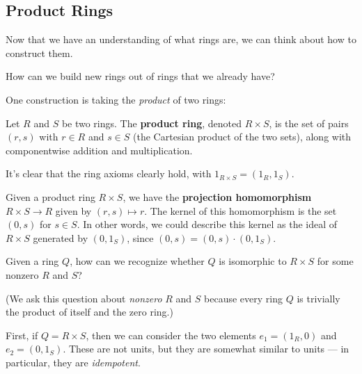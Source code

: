 \subsection{Product Rings}

Now that we have an understanding of what rings are, we can think about how to construct them. 

\begin{qq}
How can we build new rings out of rings that we already have?
\end{qq}

One construction is taking the \emph{product} of two rings:

\begin{definition}
Let $R$ and $S$ be two rings. The \textbf{product ring}, denoted $R \times S$, is the set of pairs $(r, s)$ with $r \in R$ and $s \in S$ (the Cartesian product of the two sets), along with componentwise addition and multiplication.
\end{definition}

It's clear that the ring axioms clearly hold, with $1_{R \times S} = (1_R, 1_S)$. 

Given a product ring $R \times S$, we have the \textbf{projection homomorphism} $R \times S \to R$ given by $(r, s) \mapsto r$. The kernel of this homomorphism is the set $(0, s)$ for $s \in S$. In other words, we could describe this kernel as the ideal of $R \times S$ generated by $(0, 1_S)$, since $(0, s) = (0, s)\cdot (0, 1_S)$. 




\begin{qq}
Given a ring $Q$, how can we recognize whether $Q$ is isomorphic to $R \times S$ for some nonzero $R$ and $S$?
\end{qq}

(We ask this question about \emph{nonzero} $R$ and $S$ because every ring $Q$ is trivially the product of itself and the zero ring.)

First, if $Q = R \times S$, then we can consider the two elements $e_1 = (1_R, 0)$ and $e_2 = (0, 1_S)$. These are not units, but they are somewhat similar to units --- in particular, they are \emph{idempotent}. 

